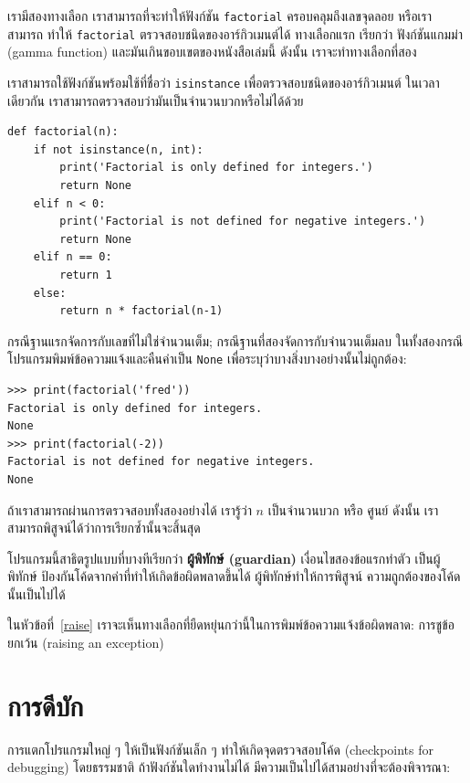 เรามีสองทางเลือก เราสามารถที่จะทำให้ฟังก์ชัน {\tt factorial} ครอบคลุมถึงเลขจุดลอย หรือเราสามารถ
ทำให้ {\tt factorial} ตรวจสอบชนิดของอาร์กิวเมนต์ได้ ทางเลือกแรก เรียกว่า ฟังก์ชันแกมม่า (gamma function)
และมันเกินขอบเขตของหนังสือเล่มนี้ ดังนั้น เราจะทำทางเลือกที่สอง

เราสามารถใช้ฟังก์ชันพร้อมใช้ที่ชื่อว่า {\tt isinstance} เพื่อตรวจสอบชนิดของอาร์กิวเมนต์ ในเวลาเดียวกัน
เราสามารถตรวจสอบว่ามันเป็นจำนวนบวกหรือไม่ได้ด้วย

\begin{verbatim}
def factorial(n):
    if not isinstance(n, int):
        print('Factorial is only defined for integers.')
        return None
    elif n < 0:
        print('Factorial is not defined for negative integers.')
        return None
    elif n == 0:
        return 1
    else:
        return n * factorial(n-1)
\end{verbatim}
%
กรณีฐานแรกจัดการกับเลขที่ไม่ใช่จำนวนเต็ม; กรณีฐานที่สองจัดการกับจำนวนเต็มลบ ในทั้งสองกรณี
โปรแกรมพิมพ์ข้อความแจ้งและคืนค่าเป็น {\tt None} เพื่อระบุว่าบางสิ่งบางอย่างนั้นไม่ถูกต้อง:

\begin{verbatim}
>>> print(factorial('fred'))
Factorial is only defined for integers.
None
>>> print(factorial(-2))
Factorial is not defined for negative integers.
None
\end{verbatim}
% 
ถ้าเราสามารถผ่านการตรวจสอบทั้งสองอย่างได้ เรารู้ว่า $n$ เป็นจำนวนบวก หรือ ศูนย์
ดังนั้น เราสามารถพิสูจน์ได้ว่าการเรียกซ้ำนั้นจะสิ้นสุด

โปรแกรมนี้สาธิตรูปแบบที่บางทีเรียกว่า {\bf ผู้พิทักษ์ (guardian)} เงื่อนไขสองข้อแรกทำตัว
เป็นผู้พิทักษ์ ป้องกันโค้ดจากค่าที่ทำให้เกิดข้อผิดพลาดขึ้นได้ ผู้พิทักษ์ทำให้การพิสูจน์
ความถูกต้องของโค้ดนั้นเป็นไปได้

ในหัวข้อที่~\ref{raise} เราจะเห็นทางเลือกที่ยืดหยุ่นกว่านี้ในการพิมพ์ข้อความแจ้งข้อผิดพลาด: 
การชูข้อยกเว้น (raising an exception)


\section{การดีบัก}
\label{factdebug}

การแตกโปรแกรมใหญ่ ๆ ให้เป็นฟังก์ชันเล็ก ๆ ทำให้เกิดจุดตรวจสอบโค้ด (checkpoints for debugging) โดยธรรมชาติ
ถ้าฟังก์ชันใดทำงานไม่ได้ มีความเป็นไปได้สามอย่างที่จะต้องพิจารณา:

